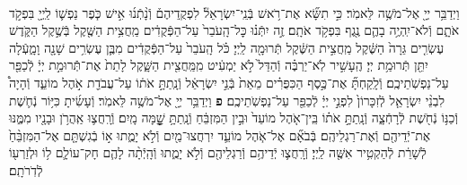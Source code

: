 \documentclass[twoside, openany, parskip=half, 11pt]{book}
\begin{document}
\begin{footnotesize}
\begin{multicols}{2}
\\
וַיְדַבֵּ֥ר יְיָ֖ אֶל־מֹשֶׁ֥ה לֵּאמֹֽר׃ כִּ֣י תִשָּׂ֞א אֶת־רֹ֥אשׁ בְּֿנֵֽי־יִשְׂרָאֵל֘ לִפְקֻֽדֵיהֶם֒ וְֿנָ֨תְֿנ֜וּ אִ֣ישׁ כֹּ֧פֶר נַפְשׁ֛וֹ לַֽיְיָ֖ בִּפְקֹ֣ד אֹתָ֑ם וְֿלֹא־יִֽהְיֶ֥ה בָהֶ֛ם נֶ֖גֶף בִּפְקֹ֥ד אֹתָֽם׃ זֶ֣ה יִתְּֿנ֗וּ כׇּל־הָֽעֹבֵר֙ עַל־הַפְּֿקֻדִ֔ים מַֽחֲצִ֥ית הַשֶּׁ֖קֶל בְּֿשֶׁ֣קֶל הַקֹּ֑דֶשׁ עֶשְׂרִ֤ים גֵּרָה֙ הַשֶּׁ֔קֶל מַֽחֲצִ֣ית הַשֶּׁ֔קֶל תְּֿרוּמָ֖ה לַֽיְיָ׃  כֹּ֗ל הָֽעֹבֵר֙ עַל־הַפְּֿקֻדִ֔ים מִבֶּ֛ן עֶשְׂרִ֥ים שָׁנָ֖ה וָמָ֑עְֿלָה יִתֵּ֖ן תְּֿרוּמַ֥ת יְיָ׃ הֶֽעָשִׁ֣יר לֹֽא־יַרְבֶּ֗ה וְֿהַדַּל֙ לֹ֣א יַמְעִ֔יט מִֽמַּֽחֲצִ֖ית הַשָּׁ֑קֶל לָתֵת֙ אֶת־תְּֿֿרוּמַ֣ת יְיָ֔ לְֿכַפֵּ֖ר עַל־נַפְשֹֽׁתֵיכֶֽם׃ וְֿלָֽקַחְתָּ֞ אֶת־כֶּ֣סֶף הַכִּפֻּרִ֗ים מֵאֵת֙ בְּֿנֵ֣י יִשְׂרָאֵ֔ל וְֿנָֽתַתָּ֣ אֹת֔וֹ עַל־עֲבֹדַ֖ת אֹ֣הֶל מוֹעֵ֑ד וְֿהָיָה֩ לִבְנֵ֨י יִשְׂרָאֵ֤ל לְֿזִכָּרוֹן֙ לִפְנֵ֣י יְיָ֔ לְֿכַפֵּ֖ר עַל־נַפְשֹֽׁתֵיכֶֽם׃ \textbf{פ}
וַיְדַבֵּ֥ר יְיָ֖ אֶל־מֹשֶׁ֥ה לֵּאמֹֽר׃ וְֿעָשִׂ֜יתָ כִּיּ֥וֹר נְֿחֹ֛שֶׁת וְֿכַנּ֥וֹ נְֿחֹ֖שֶׁת לְֿרָחְֿצָ֑ה וְֿנָֽתַתָּ֣ אֹת֗וֹ בֵּֽין־אֹ֤הֶל מוֹעֵד֙ וּבֵ֣ין הַמִּזְבֵּ֔חַ וְֿנָֽתַתָּ֥ שׇׇׇׇׇׇָׁ֖מָּה מָֽיִם׃ וְֿרָֽחֲצ֛וּ אַֽהֲרֹ֥ן וּבָנָ֖יו מִמֶּ֑נּוּ אֶת־יְֿדֵיהֶ֖ם וְֿאֶת־רַגְלֵיהֶֽם׃ בְּֿבֹאָ֞ם אֶל־אֹ֧הֶל מוֹעֵ֛ד יִרְחֲצוּ־מַ֖יִם וְֿלֹ֣א יָמֻ֑תוּ א֣וֹ בְֿגִשְׁתָּ֤ם אֶל־הַמִּזְבֵּ֨חַ֙ לְֿשָׁרֵ֔ת לְֿהַקְטִ֥יר אִשֶּׁ֖ה לַֽיְיָ׃ וְֿרָֽחֲצ֛וּ יְֿדֵיהֶ֥ם וְֿרַגְלֵיהֶ֖ם וְֿלֹ֣א יָמֻ֑תוּ וְֿהָֽיְֿתָ֨ה לָהֶ֧ם חָק־עוֹלָ֛ם ל֥וֹ וּלְזַרְע֖וֹ לְֿדֹֽרֹתָֽם׃


\end{multicols}
\end{footnotesize}
\end{document}
